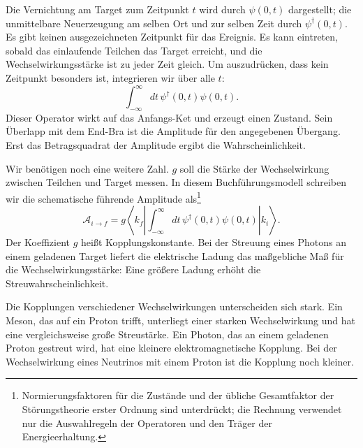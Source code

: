 Die Vernichtung am Target zum Zeitpunkt \(t\) wird durch \(\psi(0,t)\) dargestellt; die unmittelbare Neuerzeugung am selben Ort und zur selben Zeit durch \(\psi^\dagger(0,t)\). Es gibt keinen ausgezeichneten Zeitpunkt für das Ereignis. Es kann eintreten, sobald das einlaufende Teilchen das Target erreicht, und die Wechselwirkungsstärke ist zu jeder Zeit gleich. Um auszudrücken, dass kein Zeitpunkt besonders ist, integrieren wir über alle \(t\):
\begin{equation}
\int_{-\infty}^{\infty}dt\,\psi^\dagger(0,t)\psi(0,t).
\end{equation}
Dieser Operator wirkt auf das Anfangs-Ket und erzeugt einen Zustand. Sein Überlapp mit dem End-Bra ist die Amplitude für den angegebenen Übergang. Erst das Betragsquadrat der Amplitude ergibt die Wahrscheinlichkeit.

Wir benötigen noch eine weitere Zahl. \(g\) soll die Stärke der Wechselwirkung zwischen Teilchen und Target messen. In diesem Buchführungsmodell schreiben wir die schematische führende Amplitude als\footnote{Normierungsfaktoren für die Zustände und der übliche Gesamtfaktor der Störungstheorie erster Ordnung sind unterdrückt; die Rechnung verwendet nur die Auswahlregeln der Operatoren und den Träger der Energieerhaltung.}
\begin{equation}
\mathcal A_{i\to f}
=g\left\langle k_f\left|
\int_{-\infty}^{\infty}dt\,
\psi^\dagger(0,t)\psi(0,t)
\right|k_i\right\rangle.
\end{equation}
Der Koeffizient \(g\) heißt Kopplungskonstante. Bei der Streuung eines Photons an einem geladenen Target liefert die elektrische Ladung das maßgebliche Maß für die Wechselwirkungsstärke: Eine größere Ladung erhöht die Streuwahrscheinlichkeit.

Die Kopplungen verschiedener Wechselwirkungen unterscheiden sich stark. Ein Meson, das auf ein Proton trifft, unterliegt einer starken Wechselwirkung und hat eine vergleichsweise große Streustärke. Ein Photon, das an einem geladenen Proton gestreut wird, hat eine kleinere elektromagnetische Kopplung. Bei der Wechselwirkung eines Neutrinos mit einem Proton ist die Kopplung noch kleiner.

\begin{classroomqa}
\end{classroomqa}

